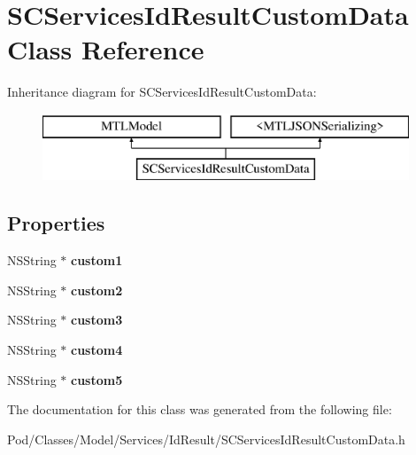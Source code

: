\hypertarget{interface_s_c_services_id_result_custom_data}{}\section{S\+C\+Services\+Id\+Result\+Custom\+Data Class Reference}
\label{interface_s_c_services_id_result_custom_data}
Inheritance diagram for S\+C\+Services\+Id\+Result\+Custom\+Data\+:\begin{figure}[H]
\begin{center}
\leavevmode
\includegraphics[height=2.000000cm]{interface_s_c_services_id_result_custom_data}
\end{center}
\end{figure}
\subsection*{Properties}
\begin{DoxyCompactItemize}
\item 
N\+S\+String $\ast$ {\bfseries custom1}\hypertarget{interface_s_c_services_id_result_custom_data_a56b383773c1ca0d9ebd631eb0785dde6}{}\label{interface_s_c_services_id_result_custom_data_a56b383773c1ca0d9ebd631eb0785dde6}

\item 
N\+S\+String $\ast$ {\bfseries custom2}\hypertarget{interface_s_c_services_id_result_custom_data_a0383951155526a8f9a4b764d342b6270}{}\label{interface_s_c_services_id_result_custom_data_a0383951155526a8f9a4b764d342b6270}

\item 
N\+S\+String $\ast$ {\bfseries custom3}\hypertarget{interface_s_c_services_id_result_custom_data_aa89977da6d42ca1535db34af988a75cc}{}\label{interface_s_c_services_id_result_custom_data_aa89977da6d42ca1535db34af988a75cc}

\item 
N\+S\+String $\ast$ {\bfseries custom4}\hypertarget{interface_s_c_services_id_result_custom_data_a21c5c5bbbd88270e97b8c5bffb8e1b49}{}\label{interface_s_c_services_id_result_custom_data_a21c5c5bbbd88270e97b8c5bffb8e1b49}

\item 
N\+S\+String $\ast$ {\bfseries custom5}\hypertarget{interface_s_c_services_id_result_custom_data_a4bc68df949deee7fd27f1bd935043c74}{}\label{interface_s_c_services_id_result_custom_data_a4bc68df949deee7fd27f1bd935043c74}

\end{DoxyCompactItemize}


The documentation for this class was generated from the following file\+:\begin{DoxyCompactItemize}
\item 
Pod/\+Classes/\+Model/\+Services/\+Id\+Result/S\+C\+Services\+Id\+Result\+Custom\+Data.\+h\end{DoxyCompactItemize}
